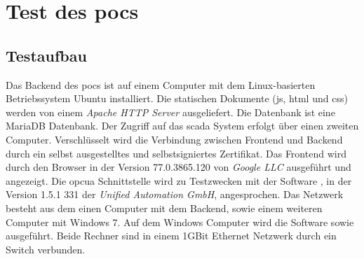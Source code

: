 \section{Test des \acp{poc} }\label{sec:poc:test}
\subsection{Testaufbau}
Das Backend des \acp{poc} ist auf einem Computer mit dem Linux-basierten Betriebssystem Ubuntu installiert. 
Die statischen Dokumente (\ac{js}, \ac{html} und \ac{css}) werden von einem \emph{Apache HTTP Server} \citep{apache} ausgeliefert.
Die Datenbank ist eine MariaDB Datenbank.
Der Zugriff auf das \ac{scada} System erfolgt über einen zweiten Computer.
Verschlüsselt wird die Verbindung zwischen Frontend und Backend durch ein selbst ausgestelltes und selbstsigniertes Zertifikat.
Das Frontend wird durch den Browser  in der Version 77.0.3865.120 von \emph{Google LLC} ausgeführt und angezeigt.
Die \ac{opcua} Schnittstelle wird zu Testzwecken mit der Software , in der Version 1.5.1 331 der \emph{Unified Automation GmbH}, angesprochen.
Das Netzwerk besteht aus dem einen Computer mit dem Backend, sowie einem weiteren Computer mit Windows 7.
Auf dem Windows Computer wird die Software  sowie  ausgeführt.
Beide Rechner sind in einem  1GBit Ethernet Netzwerk durch ein Switch verbunden.





